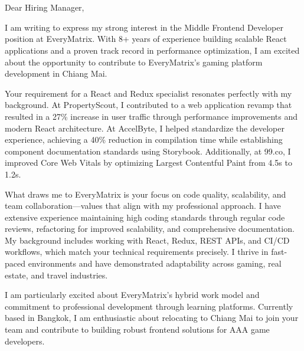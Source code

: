 \documentclass[11pt,a4paper,sans]{moderncv}
\begin{document}
\makecvtitle

\vspace{-30pt}

\section{}

Dear Hiring Manager,

\vspace{10pt}

I am writing to express my strong interest in the Middle Frontend Developer position at EveryMatrix. With 8+ years of experience building scalable React applications and a proven track record in performance optimization, I am excited about the opportunity to contribute to EveryMatrix's gaming platform development in Chiang Mai.

\vspace{8pt}

Your requirement for a React and Redux specialist resonates perfectly with my background. At PropertyScout, I contributed to a web application revamp that resulted in a 27\% increase in user traffic through performance improvements and modern React architecture. At AccelByte, I helped standardize the developer experience, achieving a 40\% reduction in compilation time while establishing component documentation standards using Storybook. Additionally, at 99.co, I improved Core Web Vitals by optimizing Largest Contentful Paint from 4.5s to 1.2s.

\vspace{8pt}

What draws me to EveryMatrix is your focus on code quality, scalability, and team collaboration---values that align with my professional approach. I have extensive experience maintaining high coding standards through regular code reviews, refactoring for improved scalability, and comprehensive documentation. My background includes working with React, Redux, REST APIs, and CI/CD workflows, which match your technical requirements precisely. I thrive in fast-paced environments and have demonstrated adaptability across gaming, real estate, and travel industries.

\vspace{8pt}

I am particularly excited about EveryMatrix's hybrid work model and commitment to professional development through learning platforms. Currently based in Bangkok, I am enthusiastic about relocating to Chiang Mai to join your team and contribute to building robust frontend solutions for AAA game developers.
\end{document}

